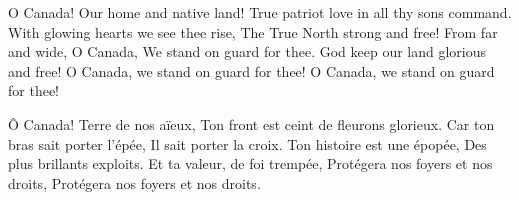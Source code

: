 O Canada! Our home and native land!
True patriot love in all thy sons command.
With glowing hearts we see thee rise,
The True North strong and free!
From far and wide, O Canada,
We stand on guard for thee.
God keep our land glorious and free!
O Canada, we stand on guard for thee!
O Canada, we stand on guard for thee!

\^{O} Canada! Terre de nos a\"ieux,
Ton front est ceint de fleurons glorieux.
Car ton bras sait porter l'\'{e}p\'{e}e,
Il sait porter la croix.
Ton histoire est une \'{e}pop\'{e}e,
Des plus brillants exploits.
Et ta valeur, de foi tremp\'{e}e,
Prot\'{e}gera nos foyers et nos droits,
Prot\'{e}gera nos foyers et nos droits.